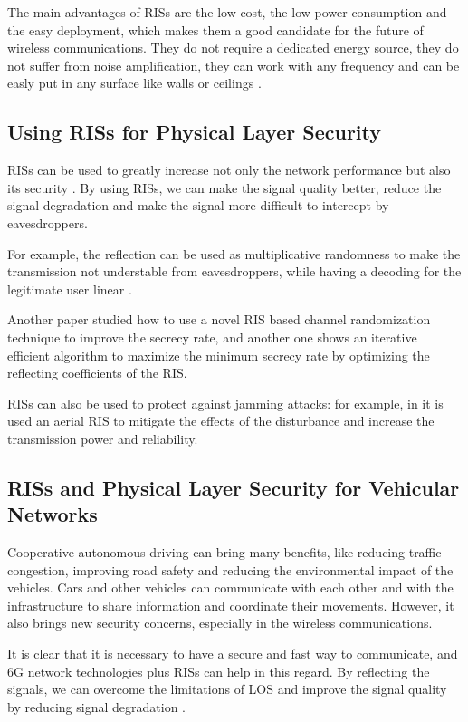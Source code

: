 The main advantages of RISs are the low cost, the low power consumption and the easy deployment, which makes them a good candidate for the future of wireless communications. They do not require a dedicated energy source, they do not suffer from noise amplification, they can work with any frequency and can be easly put in any surface like walls or ceilings \cite{8796365}.

\subsection{Using RISs for Physical Layer Security}

RISs can be used to greatly increase not only the network performance but also its security \cite{10409564}. By using RISs, we can make the signal quality better, reduce the signal degradation and make the signal more difficult to intercept by eavesdroppers.

For example, the reflection can be used as multiplicative randomness to make the transmission not understable from eavesdroppers, while having a decoding for the legitimate user linear \cite{9328149}.

Another paper \cite{s21041439} studied how to use a novel RIS based channel randomization technique to improve the secrecy rate, and another one \cite{8742603} shows an iterative efficient algorithm to maximize the minimum secrecy rate by optimizing the reflecting coefficients of the RIS.

RISs can also be used to protect against jamming attacks: for example, in \cite{9424472} it is used an aerial RIS to mitigate the effects of the disturbance and increase the transmission power and reliability.

\subsection{RISs and Physical Layer Security for Vehicular Networks}

Cooperative autonomous driving can bring many benefits, like reducing traffic congestion, improving road safety and reducing the environmental impact of the vehicles. Cars and other vehicles can communicate with each other and with the infrastructure to share information and coordinate their movements. However, it also brings new security concerns, especially in the wireless communications.

It is clear that it is necessary to have a secure and fast way to communicate, and 6G network technologies plus RISs can help in this regard. By reflecting the signals, we can overcome the limitations of LOS and improve the signal quality by reducing signal degradation \cite{10715713}.


